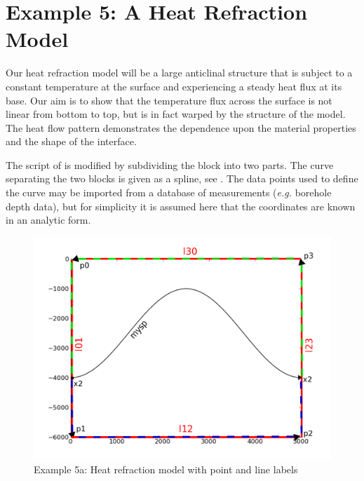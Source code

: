 
%
%
%

\section{Example 5: A Heat Refraction Model}
\label{example5}
Our heat refraction model will be a large anticlinal structure that is subject
to a constant temperature at the surface and experiencing a steady heat flux at
its base. Our aim is to show that the temperature flux across the surface is
not linear from bottom to top, but is in fact warped by the structure of the
model. The heat flow pattern demonstrates the dependence upon the material
properties and the shape of the interface.

The script of  is modified by subdividing the block into two
parts. The curve separating the two blocks is given as a spline, see
. The data points
used to define the curve may be imported from a database of measurements
(\textit{e.g.} borehole depth data), but for simplicity it is assumed here that
the coordinates are known in an analytic form.

\begin{figure}[ht]
\centerline{\includegraphics[width=4.in]{figures/anticlineheatrefraction}}
\caption{Example 5a: Heat refraction model with point and line labels}
\label{fig:anticlinehrmodel}
\end{figure}


